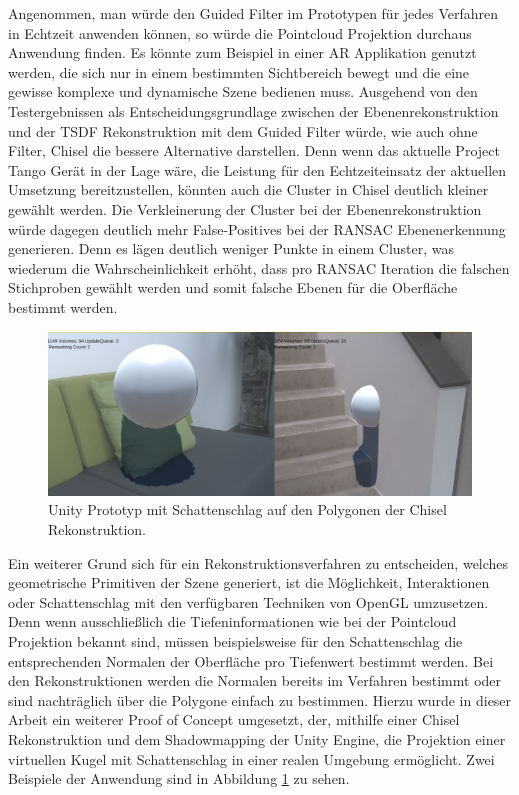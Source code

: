Angenommen, man würde den Guided Filter im Prototypen für jedes Verfahren in Echtzeit anwenden können, so würde die Pointcloud Projektion durchaus Anwendung finden. Es könnte zum Beispiel in einer AR Applikation genutzt werden, die sich nur in einem bestimmten Sichtbereich bewegt und die eine gewisse komplexe und dynamische Szene bedienen muss. Ausgehend von den Testergebnissen als Entscheidungsgrundlage zwischen der Ebenenrekonstruktion und der TSDF Rekonstruktion mit dem Guided Filter würde, wie auch ohne Filter, Chisel die bessere Alternative darstellen. Denn wenn das aktuelle Project Tango Gerät in der Lage wäre, die Leistung für den Echtzeiteinsatz der aktuellen Umsetzung bereitzustellen, könnten auch die Cluster in Chisel deutlich kleiner gewählt werden. Die Verkleinerung der Cluster bei der Ebenenrekonstruktion würde dagegen deutlich mehr False-Positives bei der RANSAC Ebenenerkennung generieren. Denn es lägen deutlich weniger Punkte in einem Cluster, was wiederum die Wahrscheinlichkeit erhöht, dass pro RANSAC Iteration die falschen Stichproben gewählt werden und somit falsche Ebenen für die Oberfläche bestimmt werden.

\begin{figure}[h]
  \centering
	\includegraphics[width=1.0\textwidth]{content/images/shadow.png} 
  \caption{Unity Prototyp mit Schattenschlag auf den Polygonen der Chisel Rekonstruktion.}
  \label{fig:shadow}
\end{figure}

Ein weiterer Grund sich für ein Rekonstruktionsverfahren zu entscheiden, welches geometrische Primitiven der Szene generiert, ist die Möglichkeit, Interaktionen oder Schattenschlag mit den verfügbaren Techniken von OpenGL umzusetzen. Denn wenn ausschließlich die Tiefeninformationen wie bei der Pointcloud Projektion bekannt sind, müssen beispielsweise für den Schattenschlag die entsprechenden Normalen der Oberfläche pro Tiefenwert bestimmt werden. Bei den Rekonstruktionen werden die Normalen bereits im Verfahren bestimmt oder sind nachträglich über die Polygone einfach zu bestimmen. Hierzu wurde in dieser Arbeit ein weiterer Proof of Concept umgesetzt, der, mithilfe einer Chisel Rekonstruktion und dem Shadowmapping der Unity Engine, die Projektion einer virtuellen Kugel mit Schattenschlag in einer realen Umgebung ermöglicht. Zwei Beispiele der Anwendung sind in Abbildung \ref{fig:shadow} zu sehen.


